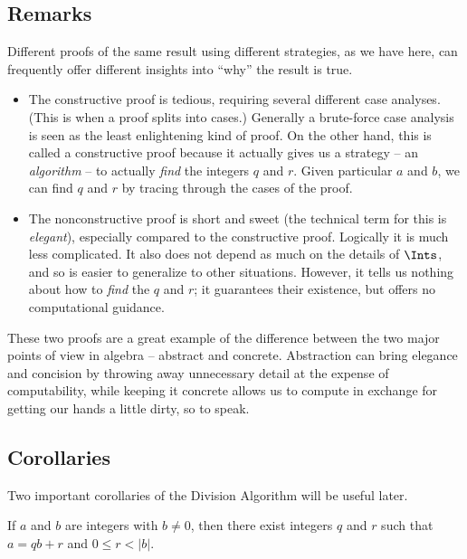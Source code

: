 \documentclass{article}
\begin{document}
\subsection*{Remarks}

Different proofs of the same result using different strategies, as we have here, can frequently offer different insights into ``why'' the result is true.
\begin{itemize}
\item The constructive proof is tedious, requiring several different case analyses. (This is when a proof splits into cases.) Generally a brute-force case analysis is seen as the least enlightening kind of proof. On the other hand, this is called a constructive proof because it actually gives us a strategy -- an \emph{algorithm} -- to actually \emph{find} the integers $q$ and $r$. Given particular $a$ and $b$, we can find $q$ and $r$ by tracing through the cases of the proof.

\item The nonconstructive proof is short and sweet (the technical term for this is \emph{elegant}), especially compared to the constructive proof. Logically it is much less complicated. It also does not depend as much on the details of $\Ints$, and so is easier to generalize to other situations. However, it tells us nothing about how to \emph{find} the $q$ and $r$; it guarantees their existence, but offers no computational guidance.
\end{itemize}

These two proofs are a great example of the difference between the two major points of view in algebra -- abstract and concrete. Abstraction can bring elegance and concision by throwing away unnecessary detail at the expense of computability, while keeping it concrete allows us to compute in exchange for getting our hands a little dirty, so to speak.



\subsection*{Corollaries}

Two important corollaries of the Division Algorithm will be useful later.

\begin{cor}
If $a$ and $b$ are integers with $b \neq 0$, then there exist integers $q$ and $r$ such that $a = qb + r$ and $0 \leq r < |b|$.
\end{cor}
\end{document}
